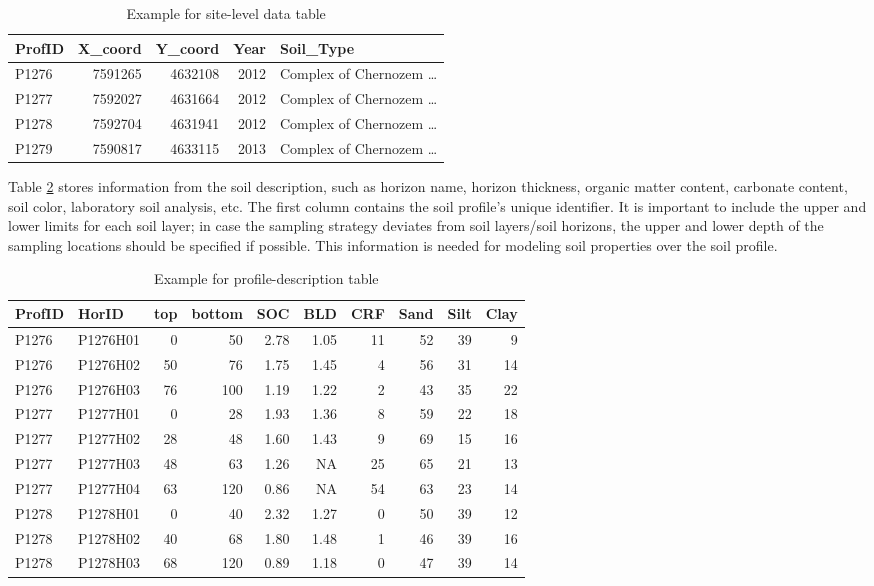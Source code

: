 \documentclass[10pt,b5paper,]{book}
\theoremstyle{definition}
\theoremstyle{definition}
\theoremstyle{definition}
\theoremstyle{remark}
\begin{document}
\begin{table}

\caption{\label{tab:site-level}Example for site-level data table}
\centering
\begin{tabular}[t]{lrrrl}
\toprule
ProfID & X\_coord & Y\_coord & Year & Soil\_Type\\
\midrule
P1276 & 7591265 & 4632108 & 2012 & Complex of Chernozem …\\
P1277 & 7592027 & 4631664 & 2012 & Complex of Chernozem …\\
P1278 & 7592704 & 4631941 & 2012 & Complex of Chernozem …\\
P1279 & 7590817 & 4633115 & 2013 & Complex of Chernozem …\\
\bottomrule
\end{tabular}
\end{table}

Table \ref{tab:horizon-level} stores information from the soil
description, such as horizon name, horizon thickness, organic matter
content, carbonate content, soil color, laboratory soil analysis, etc.
The first column contains the soil profile's unique identifier. It is
important to include the upper and lower limits for each soil layer; in
case the sampling strategy deviates from soil layers/soil horizons, the
upper and lower depth of the sampling locations should be specified if
possible. This information is needed for modeling soil properties over
the soil profile.

\begin{table}

\caption{\label{tab:horizon-level}Example for profile-description table}
\centering
\begin{tabular}[t]{llrrrrrrrr}
\toprule
ProfID & HorID & top & bottom & SOC & BLD & CRF & Sand & Silt & Clay\\
\midrule
P1276 & P1276H01 & 0 & 50 & 2.78 & 1.05 & 11 & 52 & 39 & 9\\
P1276 & P1276H02 & 50 & 76 & 1.75 & 1.45 & 4 & 56 & 31 & 14\\
P1276 & P1276H03 & 76 & 100 & 1.19 & 1.22 & 2 & 43 & 35 & 22\\
P1277 & P1277H01 & 0 & 28 & 1.93 & 1.36 & 8 & 59 & 22 & 18\\
P1277 & P1277H02 & 28 & 48 & 1.60 & 1.43 & 9 & 69 & 15 & 16\\
\addlinespace
P1277 & P1277H03 & 48 & 63 & 1.26 & NA & 25 & 65 & 21 & 13\\
P1277 & P1277H04 & 63 & 120 & 0.86 & NA & 54 & 63 & 23 & 14\\
P1278 & P1278H01 & 0 & 40 & 2.32 & 1.27 & 0 & 50 & 39 & 12\\
P1278 & P1278H02 & 40 & 68 & 1.80 & 1.48 & 1 & 46 & 39 & 16\\
P1278 & P1278H03 & 68 & 120 & 0.89 & 1.18 & 0 & 47 & 39 & 14\\
\bottomrule
\end{tabular}
\end{table}
\end{document}
